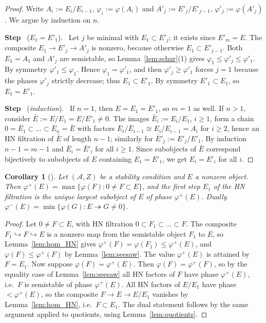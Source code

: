 \documentclass[12pt]{amsart}
\newtheorem{corollary}[theorem]{Corollary}
\numberwithin{theorem}{section}
\theoremstyle{definition}
\newcounter{pstep}
\newcommand{\step}[1]{\par\medskip\noindent\refstepcounter{pstep}\textbf{Step \thepstep}\ (\textit{#1}).\ \ignorespaces}
\newcommand{\calA}{\mathcal{A}}
\begin{document}
	\begin{proof}
		Write $A_i := E_i / E_{i-1}$, $\varphi_i := \varphi(A_i)$ and $A'_j := E'_j / E'_{j-1}$, $\varphi'_j := \varphi(A'_j)$. We argue by induction on $n$.
		
		\step{$E_1 = E'_1$} Let $j$ be minimal with $E_1 \subset E'_j$; it exists since $E'_m = E$. The composite $E_1 \to E'_j \to A'_j$ is nonzero, because otherwise $E_1 \subset E'_{j-1}$. Both $E_1 = A_1$ and $A'_j$ are semistable, so Lemma~\ref{lem:schur}(1) gives $\varphi_1 \leqslant \varphi'_j \leqslant \varphi'_1$. By symmetry $\varphi'_1 \leqslant \varphi_1$. Hence $\varphi_1 = \varphi'_1$, and then $\varphi'_j \geqslant \varphi'_1$ forces $j = 1$ because the phases $\varphi'_j$ strictly decrease; thus $E_1 \subset E'_1$. By symmetry $E'_1 \subset E_1$, so $E_1 = E'_1$.
		
		\step{induction} If $n = 1$, then $E = E_1 = E'_1$, so $m = 1$ as well. If $n > 1$, consider $\bar E := E / E_1 = E / E'_1 \neq 0$. The images $\bar E_i := E_i / E_1$, $i \geqslant 1$, form a chain $0 = \bar E_1 \subset \ldots \subset \bar E_n = \bar E$ with factors $\bar E_i / \bar E_{i-1} \cong E_i / E_{i-1} = A_i$ for $i \geqslant 2$, hence an HN filtration of $\bar E$ of length $n - 1$; similarly for $\bar E'_j := E'_j / E'_1$. By induction $n - 1 = m - 1$ and $\bar E_i = \bar E'_i$ for all $i \geqslant 1$. Since subobjects of $\bar E$ correspond bijectively to subobjects of $E$ containing $E_1 = E'_1$, we get $E_i = E'_i$ for all $i$.
	\end{proof}
	
	\begin{corollary}[{\cite[Prop.~1.9]{Rud97}}]
		\label{cor:HN_sub}
		Let $(\calA, Z)$ be a stability condition and $E$ a nonzero object. Then $\varphi^+(E) = \max \{ \varphi(F) : 0 \neq F \subset E \}$, and the first step $E_1$ of the HN filtration is the unique largest subobject of $E$ of phase $\varphi^+(E)$. Dually $\varphi^-(E) = \min \{ \varphi(G) : E \twoheadrightarrow G \neq 0 \}$.
	\end{corollary}
	
	\begin{proof}
		Let $0 \neq F \subset E$, with HN filtration $0 \subset F_1 \subset \ldots \subset F$. The composite $F_1 \hookrightarrow F \hookrightarrow E$ is a nonzero map from the semistable object $F_1$ to $E$, so Lemma~\ref{lem:hom_HN} gives $\varphi^+(F) = \varphi(F_1) \leqslant \varphi^+(E)$, and $\varphi(F) \leqslant \varphi^+(F)$ by Lemma~\ref{lem:seesaw}. The value $\varphi^+(E)$ is attained by $F = E_1$. Now suppose $\varphi(F) = \varphi^+(E)$. Then $\varphi(F) = \varphi^+(F)$, so by the equality case of Lemma~\ref{lem:seesaw} all HN factors of $F$ have phase $\varphi^+(E)$, i.e.\ $F$ is semistable of phase $\varphi^+(E)$. All HN factors of $E / E_1$ have phase $< \varphi^+(E)$, so the composite $F \to E \to E / E_1$ vanishes by Lemma~\ref{lem:hom_HN}, i.e.\ $F \subset E_1$. The dual statement follows by the same argument applied to quotients, using Lemma~\ref{lem:quotients}.
	\end{proof}
	
\end{document}
